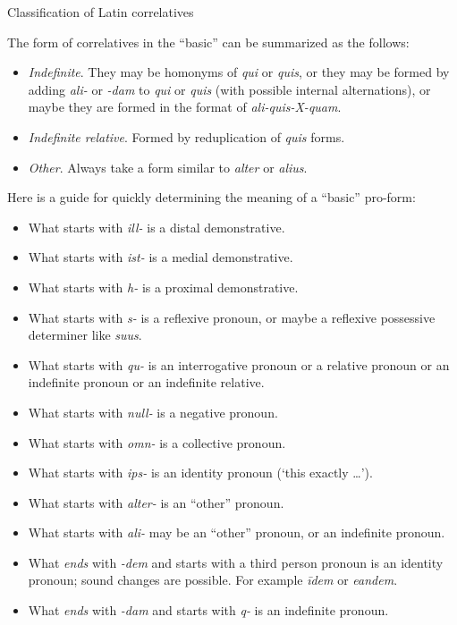 \documentclass[a4paper, oneside, 12pt]{report}
\newcommand{\form}[1]{\emph{#1}}
\newcommand{\translate}[1]{`#1'}
\begin{document}
\begin{sidewaystable}
    \centering
    \caption{Classification of Latin correlatives}
    \label{tbl:correlatives}
    {\small }
\end{sidewaystable}

The form of correlatives in the ``basic'' can be summarized as the follows:
\begin{itemize}
    \item \emph{Indefinite}. They may be homonyms of \form{qui} or \form{quis},
    or they may be formed by adding \form{ali-} or \form{-dam} to \form{qui} or \form{quis}
    (with possible internal alternations), 
    or maybe they are formed in the format of \form{ali-quis-X-quam}.
    \item \emph{Indefinite relative}. Formed by reduplication of \form{quis} forms.
    \item \emph{Other}. Always take a form similar to \form{alter} or \form{alius}.  
\end{itemize}

Here is a guide for quickly determining the meaning of a ``basic'' pro-form:
\begin{itemize}
    \item What starts with \form{ill-} is a distal demonstrative.
    \item What starts with \form{ist-} is a medial demonstrative.
    \item What starts with \form{h-} is a proximal demonstrative.
    \item What starts with \form{s-} is a reflexive pronoun, 
    or maybe a reflexive possessive determiner like \form{suus}.
    \item What starts with \form{qu-} is an interrogative pronoun 
    or a relative pronoun or an indefinite pronoun 
    or an indefinite relative.
    \item What starts with \form{null-} is a negative pronoun.
    \item What starts with \form{omn-} is a collective pronoun.
    \item What starts with \form{ips-} is an identity pronoun (\translate{this exactly \dots}).
    \item What starts with \form{alter-} is an ``other'' pronoun.
    \item What starts with \form{ali-} may be an ``other'' pronoun, or an indefinite pronoun.
    \item What \emph{ends} with \form{-dem} and starts with a third person pronoun
        is an identity pronoun; sound changes are possible. 
        For example \form{īdem} or \form{eandem}. 
    \item What \emph{ends} with \form{-dam} and starts with \form{q-} is an indefinite pronoun.
\end{itemize} 
\end{document}
